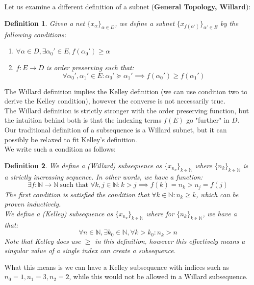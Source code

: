 \documentclass[10pt,letterpaper]{article} %
\newtheorem{defn}{Definition}[section]
\begin{document}
Let us examine a different definition of a subnet (\textbf{General Topology, Willard}):
\begin{defn}
Given a net $\{x_\alpha\}_{\alpha \in D}$, we define a subnet $\{x_{f(\alpha')}\}_{\alpha' \in E}$ by the following conditions:
\begin{enumerate}
\item $\forall \alpha \in D, \exists \alpha_0' \in E, f(\alpha_0') \geq \alpha$
\item $f: E \xrightarrow{} D$ is order preserving such that:
\begin{equation*}
\forall \alpha_0', \alpha_1' \in E: \alpha_0' \succcurlyeq \alpha_1' \implies f(\alpha_0') \geq f(\alpha_1')
\end{equation*}
\end{enumerate}   
\end{defn}
The Willard definition implies the Kelley definition (we can use condition two to derive the Kelley condition), however the converse is not necessarily true.\\

The Willard definition is strictly stronger with the order preserving function, but the intuition behind both is that the indexing terms $f(E)$ go "further" in $D$. Our traditional definition of a subsequence is a Willard subnet, but it can possibly be relaxed to fit Kelley's definition.\\

We write such a condition as follows:
\begin{defn}
We define a (Willard) subsequence as $\{x_{n_k}\}_{k \in \mathbb{N}}$ where $\{n_k\}_{k \in \mathbb{N}}$ is a strictly increasing sequence. In other words, we have a function:
\begin{equation*}
\exists f: \mathbb{N} \xrightarrow{} \mathbb{N} \ \text{such that } \forall k, j \in \mathbb{N}: k > j \implies f(k) = n_k > n_j = f(j)
\end{equation*}
The first condition is satisfied the condition that $\forall k \in \mathbb{N}: n_k \geqslant k$, which can be proven inductively.\\

We define a (Kelley) subsequence as $\{x_{n_k}\}_{k \in \mathbb{N}}$ where for $\{n_k\}_{k \in \mathbb{N}}$, we have a that:
\begin{equation*}
\forall n \in \mathbb{N}, \exists k_0 \in \mathbb{N}, \forall k > k_0: n_k > n
\end{equation*}
Note that Kelley does use $\geqslant$ in this definition, however this effectively means a singular value of a single index can create a subsequence. 
\end{defn}
What this means is we can have a Kelley subsequence with indices such as $n_0 = 1, n_1 = 3, n_2 = 2$, while this would not be allowed in a Willard subsequence.\\
\end{document}
